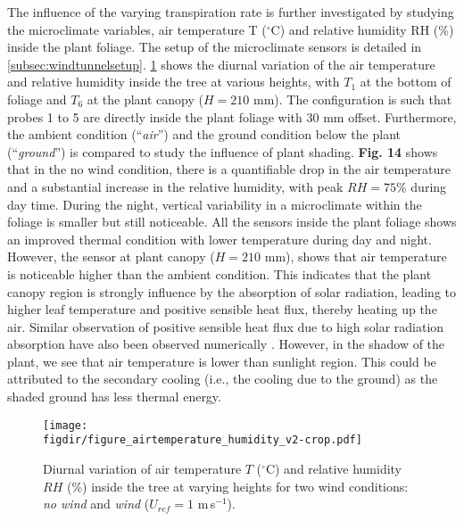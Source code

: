 The influence of the varying transpiration rate is further investigated by studying the microclimate variables, air temperature T ($^{\circ}$C) and relative humidity RH (\%) inside the plant foliage. The setup of the microclimate sensors is detailed in \cref{subsec:windtunnelsetup}. \cref{fig:figure_airtemperature_humidity_v2} shows the diurnal variation of the air temperature and relative humidity inside the tree at various heights, with $T_1$ at the bottom of foliage and $T_6$ at the plant canopy ($H=210$ mm). The configuration is such that probes 1 to 5 are directly inside the plant foliage with $30$ mm offset. Furthermore, the ambient condition (``\textit{air}'') and the ground condition below the plant (``\textit{ground}'') is compared to study the influence of plant shading. \textbf{Fig. 14} shows that in the no wind condition, there is a quantifiable drop in the air temperature and a substantial increase in the relative humidity, with peak $RH=75$\% during day time. During the night, vertical variability in a microclimate within the foliage is smaller but still noticeable. All the sensors inside the plant foliage shows an improved thermal condition with lower temperature during day and night. However, the sensor at plant canopy ($H=210$ mm), shows that air temperature is noticeable higher than the ambient condition. This indicates that the plant canopy region is strongly influence by the absorption of solar radiation, leading to higher leaf temperature and positive sensible heat flux, thereby heating up the air. Similar observation of positive sensible heat flux due to high solar radiation absorption have also been observed numerically \citep{Manickathan2018a}. However, in the shadow of the plant, we see that air temperature is lower than sunlight region. This could be attributed to the secondary cooling (i.e., the cooling due to the ground) as the shaded ground has less thermal energy. 

	\begin{figure}[t]
	\centering
	\texttt{[image: \\figdir/figure\_airtemperature\_humidity\_v2-crop.pdf]}
	\caption{Diurnal variation of air temperature $T$ ($^{\circ}$C) and relative humidity $RH$ (\%) inside the tree at varying heights for two wind conditions:  \textit{no wind} and  \textit{wind} ($U_{ref}=1$ m\,s$^{-1}$).}
	\label{fig:figure_airtemperature_humidity_v2}
	\end{figure}

